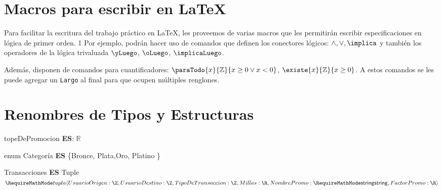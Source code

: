 \documentclass[11pt,a4paper]{article}
\newcommand{\Tipo}[1]{\mathsf{#1}}
\begin{document}
\maketitle

\section{Macros para escribir en LaTeX}

Para facilitar la escritura del trabajo práctico en LaTeX, les proveemos de varias macros que les permitirán escribir especificaciones en lógica de primer orden. 1
Por ejemplo, podrán hacer uso de comandos que definen los conectores lógicos: $\land, \lor, \implica$ y también los operadores de la lógica trivaluada $\yLuego$, $\oLuego$, $\implicaLuego$.

Además, disponen de comandos para cuantificadores: $\paraTodo{x}{\mathbb{Z}}{x \geq 0 \lor x < 0}$, $\existe{x}{\mathbb{Z}}{x \geq 0}$. A estos comandos se les puede agregar un \texttt{Largo} al final para que ocupen múltiples renglones.

\section{Renombres de Tipos y Estructuras}


\noindent topeDePromocion \textbf{ES}: $\mathbb{R}$

\noindent enum Categoría \textbf{ES} \{Bronce, Plata,Oro, Platino  \}

\vspace{0.5cm}

\noindent Transacciones \textbf{ES} Tuple $\tupla{
		UsuarioOrigen: \Tipo{\Z}, \\
		UsuarioDestino: \Tipo{\Z},
		TipoDeTransaccion: \Tipo{\Z},
		Millas: \Tipo{\R}, \\
		NombrePromo: \Tipo{\str},
		FactorPromo: \Tipo{\R}
	}$

\noindent {}
\end{document}
